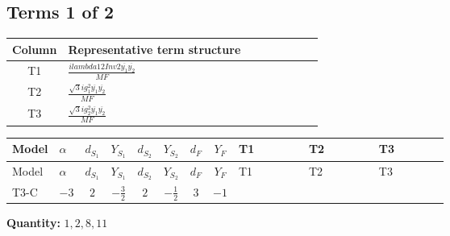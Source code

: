 \documentclass[8pt]{article}
\begin{document}
\begin{landscape}
\subsection*{Terms 1 of 2}
\begin{center}
\begin{tabular}{@{}c >{\raggedright\arraybackslash}p{0.82\linewidth}@{}}
\toprule
Column & Representative term structure \\
\midrule
T1 & \(\displaystyle \frac{i lambda12Inv2 \overline{y_{1}} \overline{y_{2}}}{MF}\) \\
\midrule
T2 & \(\displaystyle \frac{\sqrt{3} i g_{1}^{2} \overline{y_{1}} \overline{y_{2}}}{MF}\) \\
\midrule
T3 & \(\displaystyle \frac{\sqrt{3} i g_{2}^{2} \overline{y_{1}} \overline{y_{2}}}{MF}\) \\
\midrule
\bottomrule
\end{tabular}
\end{center}
\smallskip
\tiny
\begin{longtable}{@{}llcccccc >{\raggedright\arraybackslash}p{0.21\linewidth} >{\raggedright\arraybackslash}p{0.21\linewidth} >{\raggedright\arraybackslash}p{0.21\linewidth}@{}}
\toprule
Model & $\alpha$ & $d_{S_1}$ & $Y_{S_1}$ & $d_{S_2}$ & $Y_{S_2}$ & $d_F$ & $Y_F$ & T1 & T2 & T3 \\
\midrule
\endfirsthead
\toprule
Model & $\alpha$ & $d_{S_1}$ & $Y_{S_1}$ & $d_{S_2}$ & $Y_{S_2}$ & $d_F$ & $Y_F$ & T1 & T2 & T3 \\
\midrule
\endhead
T3-C & $-3$ & $2$ & $-\frac{3}{2}$ & $2$ & $-\frac{1}{2}$ & $3$ & $-1$ & \scriptsize\adjustbox{max width=\linewidth}{$\begin{gathered} - \frac{i lambda12Inv2 \overline{y_{1}} \overline{y_{2}}}{6 MF}\end{gathered}$} & \scriptsize\adjustbox{max width=\linewidth}{$\begin{gathered} - \frac{\sqrt{3} i g_{1}^{2} \overline{y_{1}} \overline{y_{2}}}{4 MF}\end{gathered}$} & \scriptsize\adjustbox{max width=\linewidth}{$\begin{gathered} - \frac{\sqrt{3} i g_{2}^{2} \overline{y_{1}} \overline{y_{2}}}{8 MF}\end{gathered}$} \\
\midrule
\bottomrule
\end{longtable}
\clearpage
\noindent\textbf{Quantity: }$\mathrm{1,2,8,11}$\par\smallskip

\end{landscape}
\end{document}
